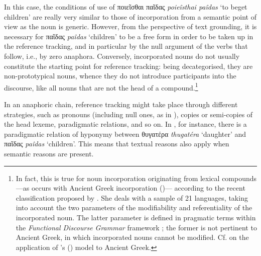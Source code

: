 \documentclass[output=paper,colorlinks,citecolor=brown]{langscibook}
\begin{document}
In this case, the conditions of use of ποιεῖσθαι παῖδας \textit{poieîsthai paîdas} `to beget children' are really very similar to those of incorporation from a semantic point of view as the noun is generic. However, from the perspective of text grounding, it is necessary for παῖδας \textit{paîdas} `children' to be a free form in order to be taken up in the reference tracking, and in particular by the null argument of the verbs that follow, i.e., by zero anaphora. Conversely, incorporated nouns do not usually constitute the starting point for reference tracking: being decategorised, they are non-prototypical nouns, whence they do not introduce participants into the discourse, like all nouns that are not the head of a compound.\footnote{In fact, this is true for noun incorporation originating from lexical compounds---as occurs with Ancient Greek incorporation ()--- according to the recent classification proposed by \citet{Olthof2020}. She deals with a sample of 21 languages, taking into account the two parameters of the modifiability and referentiality of the incorporated noun. The latter parameter is defined in pragmatic terms within the \textit{Functional Discourse Grammar} framework \citep{HengeveldMackenzie2008}; the former is not pertinent to Ancient Greek, in which incorporated nouns cannot be modified. Cf. \citet{Pompei2022}  on the application of \citeauthor{Olthof2020}'s (\citeyear{Olthof2020}) model to Ancient Greek.}

In an anaphoric chain, reference tracking might take place through different strategies, such as pronouns (including null ones, as in ), copies or semi-copies of the head lexeme, paradigmatic relations, and so on. In , for instance, there is a paradigmatic relation of hyponymy between θυγατέρα \textit{thugatéra} `daughter' and παῖδας \textit{paîdas} `children'. This means that textual reasons also apply when semantic reasons are present. 
\end{document}
